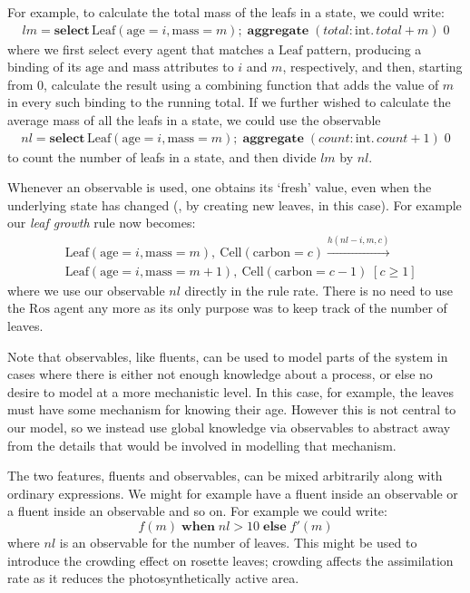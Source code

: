 For example, to calculate the total mass  of the leafs in a state, we could write:
 \begin{align*}
lm = \mathbf{select} \, \mathrm{Leaf}(\mathrm{age} = i, \mathrm{mass} = m) \mathbf{;} \; \mathbf{aggregate} \;
 (total: \mathrm{int}.\, total + m) \; 0
\end{align*}
%
where we first select every agent that matches a $\mathrm{Leaf}$ pattern,
producing a binding of its $\mathrm{age}$ and $\mathrm{mass}$ attributes to $i$
and $m$, respectively, and then, starting from $0$, calculate the result using a
combining function that adds the value of $m$ in every such binding to the
running total.
If we further wished to calculate the average mass of all the leafs in a state,
we could use the observable
\begin{align*}
nl = \mathbf{select} \, \mathrm{Leaf}(\mathrm{age} = i, \mathrm{mass} = m) \mathbf{;} \; \mathbf{aggregate} \;
 (count: \mathrm{int}.\, count + 1) \; 0
\end{align*}
%
to count the number of leafs in a state, and then divide $lm$ by $nl$.

Whenever an observable is used, one obtains its `fresh' value, even when the
underlying state has changed (\eg, by creating new leaves, in this case). For
example our \textit{leaf growth} rule now becomes:
%
\begin{align*}
&\mathrm{Leaf}(\mathrm{age} \!= \!i, \mathrm{mass} \!= \!m),\:
  \mathrm{Cell}(\mathrm{carbon} \!= \!c) \xrightarrow{h(nl-i, m, c)}\:   \\
  &
 \mathrm{Leaf}(\mathrm{age} \!= \!i, \mathrm{mass} \!= \!m+1),\:
    \mathrm{Cell}(\mathrm{carbon} \!= \!c-1) \; [c \geq  1]
\end{align*}
where we use our observable $nl$ directly in the rule rate. There is no need to
use the $\mathrm{Ros}$ agent any more as its only purpose was to keep track of
the number of leaves.

Note that observables, like fluents, can be used to model parts of the system in
cases where there is either not enough knowledge about a process, or else no
desire to model at a more mechanistic level. In this case, for example, the
leaves must have some mechanism for knowing their age. However this is not
central to our model, so we instead use global knowledge via observables to
abstract away from the details that would be involved in modelling that
mechanism.

The two features, fluents and observables, can be mixed arbitrarily along with
ordinary expressions. We might for example have a fluent inside an observable or
a fluent inside an observable and so on. For example we could write:
\begin{equation*}
f(m) \; \mathbf{when} \; nl > 10 \; \mathbf{else} \; f'(m)
\end{equation*}
where $nl$ is an observable for the number of leaves. This might be used to
introduce the crowding effect on rosette leaves; crowding affects the
assimilation rate as it reduces the photosynthetically active area.

